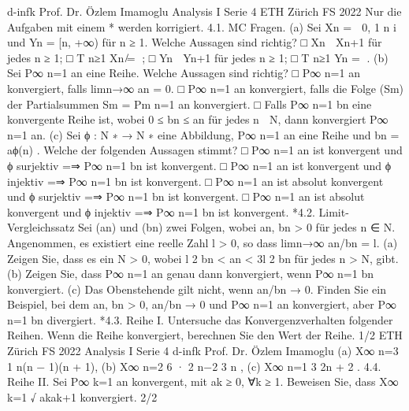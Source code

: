 d-infk
Prof. Dr. Özlem Imamoglu
Analysis I
Serie 4
ETH Zürich
FS 2022
Nur die Aufgaben mit einem * werden korrigiert.
4.1. MC Fragen.
(a) Sei Xn =

0,
1
n
i
und Yn = [n, +∞) für n ≥ 1. Welche Aussagen sind richtig?
□ Xn ⊇ Xn+1 für jedes n ≥ 1;
□
T
n≥1 Xn ̸= ∅;
□ Yn ⊆ Yn+1 für jedes n ≥ 1;
□
T
n≥1 Yn = ∅.
(b) Sei P∞
n=1 an eine Reihe. Welche Aussagen sind richtig?
□
P∞
n=1 an konvergiert, falls limn→∞
an = 0.
□
P∞
n=1 an konvergiert, falls die Folge (Sm) der Partialsummen Sm =
Pm
n=1 an
konvergiert.
□ Falls P∞
n=1 bn eine konvergente Reihe ist, wobei 0 ≤ bn ≤ an für jedes
n ∈ N, dann konvergiert P∞
n=1 an.
(c) Sei ϕ : N
∗ → N
∗
eine Abbildung, P∞
n=1 an eine Reihe und bn = aϕ(n)
. Welche der
folgenden Aussagen stimmt?
□
P∞
n=1 an ist konvergent und ϕ surjektiv =⇒
P∞
n=1 bn ist konvergent.
□
P∞
n=1 an ist konvergent und ϕ injektiv =⇒
P∞
n=1 bn ist konvergent.
□
P∞
n=1 an ist absolut konvergent und ϕ surjektiv =⇒
P∞
n=1 bn ist konvergent.
□
P∞
n=1 an ist absolut konvergent und ϕ injektiv =⇒
P∞
n=1 bn ist konvergent.
*4.2. Limit-Vergleichssatz Sei (an) und (bn) zwei Folgen, wobei an, bn > 0 für
jedes n ∈ N. Angenommen, es existiert eine reelle Zahl l > 0, so dass limn→∞
an/bn = l.
(a) Zeigen Sie, dass es ein N > 0, wobei l
2
bn < an <
3l
2
bn für jedes n > N, gibt.
(b) Zeigen Sie, dass P∞
n=1 an genau dann konvergiert, wenn P∞
n=1 bn konvergiert.
(c) Das Obenstehende gilt nicht, wenn an/bn → 0. Finden Sie ein Beispiel, bei dem
an, bn > 0, an/bn → 0 und P∞
n=1 an konvergiert, aber P∞
n=1 bn divergiert.
*4.3. Reihe I. Untersuche das Konvergenzverhalten folgender Reihen. Wenn die
Reihe konvergiert, berechnen Sie den Wert der Reihe.
1/2
ETH Zürich
FS 2022
Analysis I
Serie 4
d-infk
Prof. Dr. Özlem Imamoglu
(a) X∞
n=3
1
n(n − 1)(n + 1),
(b) X∞
n=2
6 · 2
n−2
3
n
,
(c) X∞
n=1
3
2n + 2
.
4.4. Reihe II. Sei P∞
k=1 an konvergent, mit ak ≥ 0, ∀k ≥ 1. Beweisen Sie, dass
X∞
k=1
√
akak+1
konvergiert.
2/2
